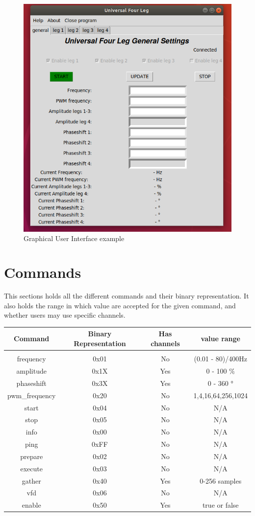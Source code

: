 \documentclass{article}
\begin{document}
\begin{figure}[h!]
\centering
\includegraphics[width=\linewidth]{pictures/GUI.png}
\caption{Graphical User Interface example}
\label{GUI}
\end{figure}


\section{Commands}
\label{sec:Commands}
This sections holds all the different commands and their binary representation.
It also holds the range in which value are accepted for the given command, and whether
users may use specific channels.\newline
\begin{tabular}{c c c c}
	\hline
	Command & Binary Representation & Has channels & value range\\
	\hline \hline \\
	frequency & 0x01 & No & (0.01 - 80)/400\si{\hertz}\\
	amplitude & 0x1X & Yes & 0 - 100 \si{\percent}\\
	phaseshift & 0x3X & Yes & 0 - 360 \si{\degree}\\
	pwm\_frequency & 0x20 & No & 1,4,16,64,256,1024 \\
	start & 0x04 & No & N/A \\
	stop & 0x05 & No & N/A \\
	info & 0x00 & No & N/A \\
	ping & 0xFF & No & N/A \\
	prepare & 0x02 & No & N/A \\
	execute & 0x03 & No & N/A \\
	gather & 0x40 & Yes & 0-256 samples \\
	vfd & 0x06 & No & N/A \\
	enable & 0x50 & Yes & true or false \\
	\hline
\end{tabular}
\end{document}
